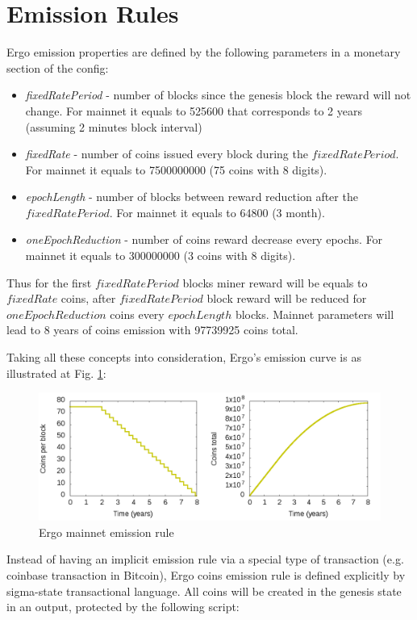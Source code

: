 \section{Emission Rules}
Ergo emission properties are defined by the following parameters in a monetary section of the config:

\begin{itemize}
    \item{\em fixedRatePeriod } - number of blocks since the genesis block the reward will not change.
    For mainnet it equals to 525600 that corresponds to 2 years (assuming 2 minutes block interval)
    \item{\em fixedRate } - number of coins issued every block during the $fixedRatePeriod$.
    For mainnet it equals to 7500000000 (75 coins with 8 digits).
    \item{\em epochLength } - number of blocks between reward reduction after the $fixedRatePeriod$.
    For mainnet it equals to 64800 (3 month).
    \item{\em oneEpochReduction } - number of coins reward decrease every epochs.
    For mainnet it equals to 300000000 (3 coins with 8 digits).
\end{itemize}

Thus for the first $fixedRatePeriod$ blocks miner reward will be equals to $fixedRate$ \ergo{} coins,
after $fixedRatePeriod$ block reward will be reduced for $oneEpochReduction$ coins every $epochLength$ blocks.
Mainnet parameters will lead to 8 years of coins emission with 97739925 coins total.

Taking all these concepts into consideration, Ergo's emission curve is as illustrated at Fig. \ref{fig:emission}:

\begin{figure}[H]
    \centering
    \includegraphics[width=\textwidth]{img/curve_combined.png}
    \caption{Ergo mainnet emission rule
    \label{fig:emission}}
\end{figure}


Instead of having an implicit emission rule via a special type of transaction (e.g. coinbase transaction in Bitcoin),
Ergo coins emission rule is defined explicitly by sigma-state transactional language.
All \ergo{} coins will be created in the genesis state in an output, protected by the following script:

